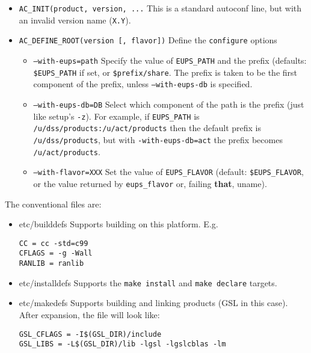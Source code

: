 \documentclass{article}
\newcommand{\code}[1]{\texttt{#1}}
\begin{document}
\begin{itemize}
  \item{\code{AC\_INIT(product, version, ...}}
    This is a standard autoconf line, but with an invalid version name (\code{X.Y}).

  \item{\code{AC\_DEFINE\_ROOT(version [, flavor])}}
    Define the \code{configure} options
    \begin{itemize}
      \item{\code{--with-eups=path}}
        Specify the value of \code{EUPS\_PATH} and the prefix
        (defaults: \code{\$EUPS\_PATH} if set, or \code{\$prefix/share}. The
	prefix is taken to be the first component of the prefix, unless
	\code{--with-eups-db} is specified.

	\item{\code{--with-eups-db=DB}}
	  Select which component of the path is the prefix (just like setup's \code{-z}).
	  For example, if \code{EUPS\_PATH} is
    \code{/u/dss/products:/u/act/products} then the default prefix is
    \code{/u/dss/products}, but with \code{\--with-eups-db=act} the
    prefix becomes \code{/u/act/products}.
    
	\item{\code{--with-flavor=XXX}}
        Set the value of \code{EUPS\_FLAVOR}
        (default: \code{\$EUPS\_FLAVOR}, or the value returned by \code{eups\_flavor}
	or, failing \textbf{that}, uname).
    \end{itemize}
\end{itemize}

The conventional files are:
\begin{itemize}
   \item{etc/builddefs}
     Supports building on this platform. E.g.
\begin{verbatim}
CC = cc -std=c99
CFLAGS = -g -Wall
RANLIB = ranlib
\end{verbatim}
  
   \item{etc/installdefs}
     Supports the \code{make install} and \code{make declare} targets.
  
   \item{etc/makedefs}
     Supports building and linking products (GSL in this case). After
     expansion, the file will look like:
\begin{verbatim}
GSL_CFLAGS = -I$(GSL_DIR)/include
GSL_LIBS = -L$(GSL_DIR)/lib -lgsl -lgslcblas -lm
\end{verbatim}
\end{itemize}
  
\end{document}
